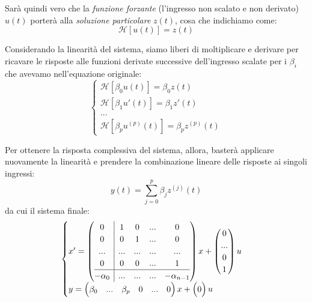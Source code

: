 \documentclass[a4paper,11pt]{article}
\begin{document}
Sarà quindi vero che la \textit{funzione forzante} (l'ingresso non scalato e non derivato) $u(t)$ porterà alla \textit{soluzione particolare} $z(t)$, cosa che indichiamo come:
$$
\mathcal{H}[u(t)] = z(t) 
$$

Considerando la linearità del sistema, siamo liberi di moltiplicare e derivare per ricavare le risposte alle funzioni derivate successive dell'ingresso scalate per i $\beta_i$ che avevamo nell'equazione originale:
\[
	\begin{cases}
		\mathcal{H}[\beta_0 u(t)] = \beta_0 z(t) \\ 
		\mathcal{H}[\beta_1 u'(t)] = \beta_1 z'(t) \\ 
		... \\
		\mathcal{H}[\beta_p u^{(p)}(t)] = \beta_p z^{(p)}(t)
	\end{cases}
\]

Per ottenere la risposta complessiva del sistema, allora, basterà applicare nuovamente la linearità e prendere la combinazione lineare delle risposte ai singoli ingressi:
$$
y(t) = \sum_{j = 0}^{p} \beta_j z^{(j)}(t)
$$
da cui il sistema finale:
\[
	\begin{cases}	
x' = \left(\begin{array}{@{}c | cccc@{}}
	0 & 1 & 0 & ... & 0 \\
	0 & 0 & 1 & ... & 0 \\
	... & ... & ... & ... & ... \\
	0 & 0 & 0 & ... & 1 \\
	\hline
	-\alpha_0 & ... & ... & ... & -\alpha_{n - 1}
\end{array}\right)
x + \begin{pmatrix}
0 \\
... \\
0 \\
1
\end{pmatrix} u \\ 
y = \begin{pmatrix}
	\beta_0 & ... & \beta_p & 0 & ... & 0
\end{pmatrix} x + \begin{pmatrix}
0
\end{pmatrix} u
	\end{cases}
\]
\end{document}
